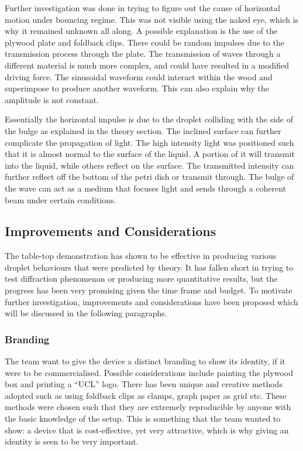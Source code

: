 Further investigation was done in trying to figure out the cause of horizontal motion under bouncing regime. This was not visible using the naked eye, which is why it remained unknown all along. A possible explanation is the use of the plywood plate and foldback clips. There could be random impulses due to the transmission process through the plate. The transmission of waves through a different material is much more complex, and could have resulted in a modified driving force. The sinusoidal waveform could interact within the wood and superimpose to produce another waveform. This can also explain why the amplitude is not constant.

Essentially the horizontal impulse is due to the droplet colliding with the side of the bulge as explained in the theory section. The inclined surface can further complicate the propagation of light. The high intensity light was positioned such that it is almost normal to the surface of the liquid. A portion of it will transmit into the liquid, while others reflect on the surface. The transmitted intensity can further reflect off the bottom of the petri dish or transmit through. The bulge of the wave can act as a medium that focuses light and sends through a coherent beam under certain conditions.

\subsection{Improvements and Considerations}
The table-top demonstration has shown to be effective in producing various droplet behaviours that were predicted by theory. It has fallen short in trying to test diffraction phenomenon or producing more quantitative results, but the progress has been very promising given the time frame and budget. To motivate further investigation, improvements and considerations have been proposed which will be discussed in the following paragraphs.

\subsubsection{Branding}
The team want to give the device a distinct branding to show its identity, if it were to be commercialised. Possible considerations include painting the plywood box and printing a ``UCL'' logo. There has been unique and creative methods adopted such as using foldback clips as clamps, graph paper as grid etc. These methods were chosen such that they are extremely reproducible by anyone with the basic knowledge of the setup. This is something that the team wanted to show: a device that is cost-effective, yet very attractive, which is why giving an identity is seen to be very important.

